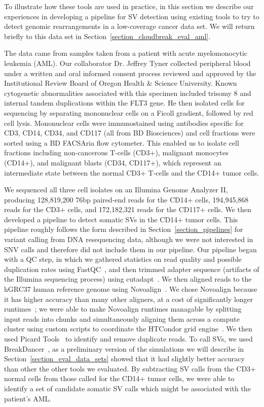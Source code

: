 To illustrate how these tools are used in practice, in this section we describe our experiences in developing a pipeline for SV detection using existing tools to try to detect genomic rearrangements in a low-coverage cancer data set. We will return briefly to this data set in Section~\ref{section_cloudbreak_eval_aml}.

The data came from samples taken from a patient with acute myelomonocytic leukemia (AML). Our collaborator Dr. Jeffrey Tyner collected peripheral blood under a written and oral informed consent process reviewed and approved by the Institutional Review Board of Oregon Health \& Science University. Known cytogenetic abnormalities associated with this specimen included trisomy 8 and internal tandem duplications within the FLT3 gene. He then isolated cells for sequencing by separating mononuclear cells on a Ficoll gradient, followed by red cell lysis. Mononuclear cells were immunostained using antibodies specific for CD3, CD14, CD34, and CD117 (all from BD Biosciences) and cell fractions were sorted using a BD FACSAria flow cytometer. This enabled us to isolate cell fractions including non-cancerous T-cells (CD3+), malignant monocytes (CD14+), and malignant blasts (CD34, CD117+), which represent an intermediate state between the normal CD3+ T-cells and the CD14+ tumor cells. 

We sequenced all three cell isolates on an Illumina Genome Analyzer II, producing 128,819,200 76bp paired-end reads for the CD14+ cells, 194,945,868 reads for the CD3+ cells, and 172,182,321 reads for the CD117+ cells. We then developed a pipeline to detect somatic SVs in the CD14+ tumor cells. This pipeline roughly follows the form described in Section~\ref{section_pipelines} for variant calling from DNA resequencing data, although we were not interested in SNV calls and therefore did not include them in our pipeline. Our pipeline began with a QC step, in which we gathered statistics on read quality and possible duplication rates using FastQC~\cite{fastqc}, and then trimmed adapter sequence (artifacts of the Illumina sequencing process) using cutadapt~\cite{Martin2011Cutadapt}. We then aligned reads to the hGRC37 human reference genome using Novoalign~\cite{novoalign}. We chose Novoalign because it has higher accuracy than many other aligners, at a cost of significantly longer runtimes~\cite{Ruffalo:2011p1758}; we were able to make Novoalign runtimes managable by splitting input reads into chunks and simultaneously aligning them across a compute cluster using custom scripts to coordinate the HTCondor grid engine~\cite{condor-practice}. We then used Picard Tools~\cite{picard} to identify and remove duplicate reads. To call SVs, we used BreakDancer~\cite{Chen:2009p3}, as a preliminary version of the simulations we will describe in Section~\ref{section_eval_data_sets} showed that it had slightly better accuracy than other the other tools we evaluated. By subtracting SV calls from the CD3+ normal cells from those called for the CD14+ tumor cells, we were able to identify a set of candidate somatic SV calls which might be associated with the patient's AML.

